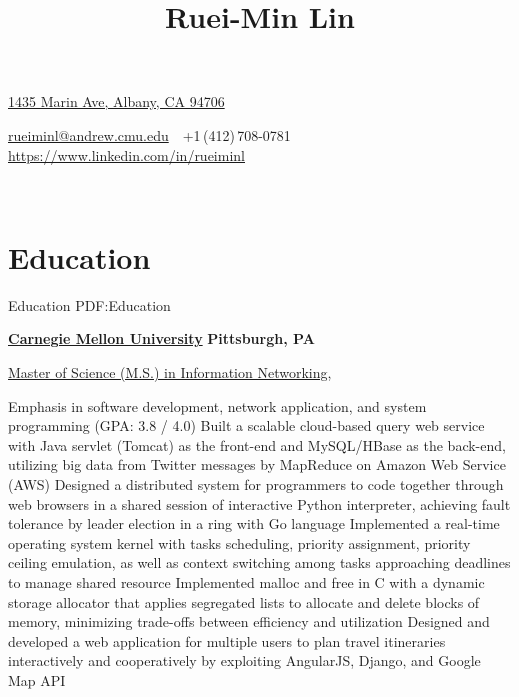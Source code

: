 \documentclass[a4paper,10pt,oneside]{article}
\begin{document}

\title{Ruei-Min Lin}

\begin{subtitle}
\href{https://www.google.com/maps/place/1435+Marin+Ave,+Albany,+CA+94706}
{1435 Marin Ave, Albany, CA 94706}
\par
\href{mailto:rueiminl@andrew.cmu.edu}
{rueiminl@andrew.cmu.edu}
\,\BulletSymbol\,
+1\,(412)\,708-0781
\,\BulletSymbol\,
\href{https://www.linkedin.com/in/rueiminl}
{https://www.linkedin.com/in/rueiminl}
\end{subtitle}

\begin{body}

\\[-2.5em]

\section{Education}
{Education}
{PDF:Education}

\href{http://www.cmu.edu/}
{\textbf{Carnegie Mellon University}}
\hfill
\textbf{Pittsburgh, PA}


\SmallEntryGap
\href{http://www.ini.cmu.edu/degrees/msin/index.html}
{Master of Science (M.S.) in Information Networking},

\begin{detail}

\BulletItem
Emphasis in software development, network application, and system programming (GPA: 3.8 / 4.0)
\BulletItem
Built a scalable cloud-based query web service with Java servlet (Tomcat) as the front-end and MySQL/HBase as the back-end, utilizing big data from Twitter messages by MapReduce on Amazon Web Service (AWS)
\BulletItem
Designed a distributed system for programmers to code together through web browsers in a shared session of interactive Python interpreter, achieving fault tolerance by leader election in a ring with Go language
\BulletItem
Implemented a real-time operating system kernel with tasks scheduling, priority assignment, priority ceiling emulation, as well as context switching among tasks approaching deadlines to manage shared resource
\BulletItem
Implemented malloc and free in C with a dynamic storage allocator that applies segregated lists to allocate and delete blocks of memory, minimizing trade-offs between efficiency and utilization
\BulletItem
Designed and developed a web application for multiple users to plan travel itineraries interactively and cooperatively by exploiting AngularJS, Django, and Google Map API
\end{detail}



\end{body}
\end{document}

